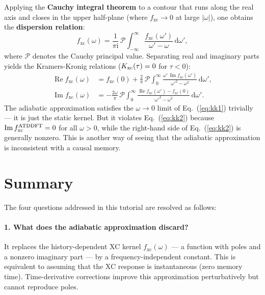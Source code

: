 \documentclass[12pt,letterpaper]{article}
\newcommand{\dd}{\mathrm{d}}
\newcommand{\ii}{\mathrm{i}}
\newcommand{\fxc}{f_{\mathrm{xc}}}
\theoremstyle{definition}
\begin{document}
Applying the \textbf{Cauchy integral theorem} to a contour that runs
along the real axis and closes in the upper half-plane (where $\fxc\to 0$
at large $|\omega|$), one obtains the \textbf{dispersion relation}:
\begin{equation}
  \fxc(\omega) = \frac{1}{\pi\ii}\,\mathcal{P}\!\int_{-\infty}^\infty
  \frac{\fxc(\omega')}{\omega'-\omega}\,\dd\omega',
\end{equation}
where $\mathcal{P}$ denotes the Cauchy principal value.
Separating real and imaginary parts yields the Kramers-Kronig relations
($K_{\rm xc}(\tau) = 0$ for $\tau < 0$):
\begin{align}
  \operatorname{Re}\fxc(\omega)
  &= \fxc(0) + \frac{2}{\pi}\,\mathcal{P}\!\int_0^\infty
     \frac{\omega'\,\operatorname{Im}\fxc(\omega')}{{\omega'}^2 - \omega^2}\,\dd\omega',
  \label{eq:kk1}\\
  \operatorname{Im}\fxc(\omega)
  &= -\frac{2\omega}{\pi}\,\mathcal{P}\!\int_0^\infty
     \frac{\operatorname{Re}\fxc(\omega') - \fxc(0)}{{\omega'}^2-\omega^2}\,\dd\omega'.
  \label{eq:kk2}
\end{align}
The adiabatic approximation satisfies the $\omega\to 0$ limit of
Eq.~(\ref{eq:kk1}) trivially --- it is just the static kernel.
But it violates Eq.~(\ref{eq:kk2}) because $\operatorname{Im}\fxc^{\rm ATDDFT} = 0$
for all $\omega > 0$, while the right-hand side of Eq.~(\ref{eq:kk2})
is generally nonzero.  This is another way of seeing that the adiabatic
approximation is inconsistent with a causal memory.

\section{Summary}
\label{sec:summary}

The four questions addressed in this tutorial are resolved as follows:

\paragraph{1. What does the adiabatic approximation discard?}
It replaces the history-dependent XC kernel $\fxc(\omega)$ --- a
function with poles and a nonzero imaginary part --- by a frequency-independent
constant.  This is equivalent to assuming that the XC response is
instantaneous (zero memory time).  Time-derivative corrections improve
this approximation perturbatively but cannot reproduce poles.
\end{document}
